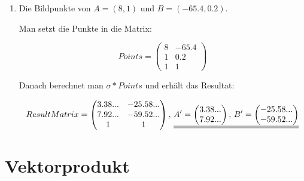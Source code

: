 \begin{enumerate}
Nun muss man dies nur noch in die Spiegelungsmatrix einsetzen:

\[
\sigma' = 
\begin{pmatrix}
\frac{5}{13} & \frac{12}{13} & 0\\
\frac{12}{13} & -\frac{5}{13} & 0\\
0 & 0 & 1
\end{pmatrix}
\]

Schliesslich kann man "da real"-Spiegelungsmatrix $\sigma$ folgendermassen berechnen:

\[
\underline{\underline{\sigma = T^{-1}\sigma T = 
\begin{pmatrix}
\frac{5}{13} & \frac{12}{13} & -\frac{8}{13}\\
\frac{12}{13} & -\frac{5}{13} & \frac{12}{13}\\
0 & 0 & 1
\end{pmatrix}}}
\]

\item Die Bildpunkte von $A = (8, 1)$ und $B=(-65.4, 0.2)$.

Man setzt die Punkte in die Matrix:

\[
Points = \begin{pmatrix}
8 & -65.4 \\
1 & 0.2 \\
1 & 1
\end{pmatrix}
\]

Danach berechnet man $\sigma * Points$ und erhält das Resultat:

\[
ResultMatrix = \begin{pmatrix}
3.38... & -25.58... \\
7.92... & -59.52... \\
1 & 1
\end{pmatrix}\textnormal{, } 
\underline{\underline{A' = 
\begin{pmatrix}
3.38...\\
7.92... 
\end{pmatrix}\textnormal{, } 
B' = 
\begin{pmatrix}
-25.58... \\
-59.52... 
\end{pmatrix}}}
\]

\end{enumerate}

\section{Vektorprodukt}

